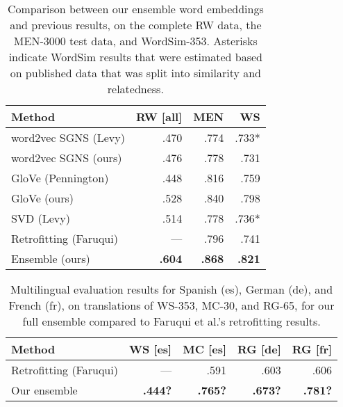 \documentclass[11pt,letterpaper]{article}
\begin{document}
\begin{table}[t]
\centering
\footnotesize
\begin{tabular}{lrrr}
\toprule
Method                        & RW [all]  &      MEN  & WS \\
\midrule
word2vec SGNS (Levy)          &     .470  &     .774  & .733* \\
word2vec SGNS (ours)          &     .476  &     .778  & .731  \\
GloVe (Pennington)            &     .448  &     .816  & .759  \\
GloVe (ours)                  &     .528  &     .840  & .798  \\
SVD (Levy)                    &     .514  &     .778  & .736* \\
Retrofitting (Faruqui)        &      ---  &     .796  & .741  \\
Ensemble (ours)               & \bf .604  & \bf .868  & \bf .821 \\
\bottomrule
\end{tabular}

\caption{
    Comparison between our ensemble word embeddings and previous results,
    on the complete RW data, the MEN-3000 test data, and WordSim-353.
    Asterisks indicate WordSim results that were estimated based on published
    data that was split into similarity and relatedness.
}
\label{compare-others}
\end{table}

\begin{table}[t]
\centering
\small
\begin{tabular}{lrrrr}
\toprule
Method   & WS [es] & MC [es] & RG [de] & RG [fr] \\
\midrule
Retrofitting (Faruqui) &         --- &       .591 &       .603 &       .606 \\
Our ensemble           &    \bf .444?&   \bf .765?& \bf   .673?& \bf   .781?\\
\bottomrule
\end{tabular}

\caption{
    Multilingual evaluation results for Spanish (es), German (de), and French
    (fr), on translations of WS-353, MC-30, and RG-65, for our full ensemble
    compared to Faruqui et al.'s retrofitting results.
}
\label{eval-multilingual}
\end{table}
\end{document}
